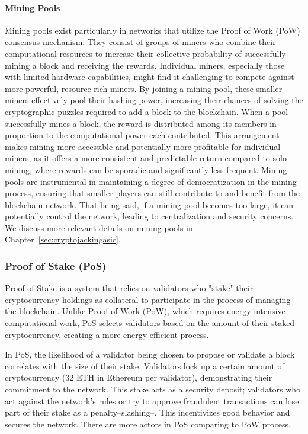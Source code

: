 \paragraph{Mining Pools}
Mining pools exist particularly in networks that utilize the Proof of Work (PoW) consensus mechanism. They consist of groups of miners who combine their computational resources to increase their collective probability of successfully mining a block and receiving the rewards. Individual miners, especially those with limited hardware capabilities, might find it challenging to compete against more powerful, resource-rich miners. By joining a mining pool, these smaller miners effectively pool their hashing power, increasing their chances of solving the cryptographic puzzles required to add a block to the blockchain. When a pool successfully mines a block, the reward is distributed among its members in proportion to the computational power each contributed. This arrangement makes mining more accessible and potentially more profitable for individual miners, as it offers a more consistent and predictable return compared to solo mining, where rewards can be sporadic and significantly less frequent. Mining pools are instrumental in maintaining a degree of democratization in the mining process, ensuring that smaller players can still contribute to and benefit from the blockchain network. That being said, if a mining pool becomes too large, it can potentially control the network, leading to centralization and security concerns. We discuss more relevant details on mining pools in Chapter~\ref{sec:cryptojackingasic}.



\subsubsection{Proof of Stake (PoS)}
Proof of Stake is a system that relies on validators who "stake" their cryptocurrency holdings as collateral to participate in the process of managing the blockchain. Unlike Proof of Work (PoW), which requires energy-intensive computational work, PoS selects validators based on the amount of their staked cryptocurrency, creating a more energy-efficient process.

In PoS, the likelihood of a validator being chosen to propose or validate a block correlates with the size of their stake. Validators lock up a certain amount of cryptocurrency (32 ETH in Ethereum per validator), demonstrating their commitment to the network. This stake acts as a security deposit; validators who act against the network's rules or try to approve fraudulent transactions can lose part of their stake as a penalty--slashing--. This incentivizes good behavior and secures the network. There are more actors in PoS comparing to PoW process.

